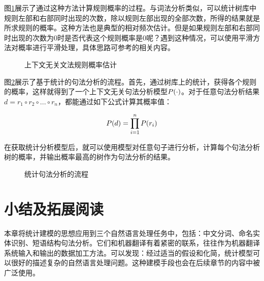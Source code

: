 \parinterval 图\ref{fig:3.4-7}展示了通过这种方法计算规则概率的过程。与词法分析类似，可以统计树库中规则左部和右部同时出现的次数，除以规则左部出现的全部次数，所得的结果就是所求规则的概率。这种方法也是典型的相对频次估计。但是如果规则左部和右部同时出现的次数为0时是否代表这个规则概率是0呢？遇到这种情况，可以使用平滑方法对概率进行平滑处理，具体思路可参考{\chaptertwo}的相关内容。

\begin{figure}[htp]
   \centering

	\caption{上下文无关文法规则概率估计}
    \label{fig:3.4-7}
\end{figure}

\parinterval 图\ref{fig:3.4-8}展示了基于统计的句法分析的流程。首先，通过树库上的统计，获得各个规则的概率，这样就得到了一个上下文无关句法分析模型${P}( \cdot )$。对于任意句法分析结果$d=r_1 \circ r_2 \circ ... \circ r_n$，都能通过如下公式计算其概率值：

\begin{equation}
{P}(d)= \prod_{i=1}^{n}{P}(r_i)
\end{equation}

\parinterval 在获取统计分析模型后，就可以使用模型对任意句子进行分析，计算每个句法分析树的概率，并输出概率最高的树作为句法分析的结果。

\begin{figure}[htp]
    \centering

	\caption{统计句法分析的流程}
    \label{fig:3.4-8}
\end{figure}



\sectionnewpage
\section{小结及拓展阅读} \label{sec3:summary}

\parinterval 本章将统计建模的思想应用到三个自然语言处理任务中，包括：中文分词、命名实体识别、短语结构句法分析。它们和机器翻译有着紧密的联系，往往作为机器翻译系统输入和输出的数据加工方法。可以发现：经过适当的假设和化简，统计模型可以很好的描述复杂的自然语言处理问题。这种建模手段也会在后续章节的内容中被广泛使用。

